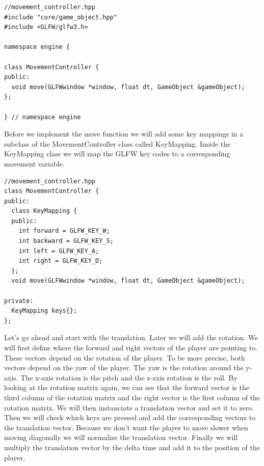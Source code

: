 \documentclass[12pt]{report} \usepackage{preamble}
\begin{document}
\begin{lstlisting}[Language=C++]
//movement_controller.hpp
#include "core/game_object.hpp"
#include <GLFW/glfw3.h>

namespace engine {

class MovementController {
public:
  void move(GLFWwindow *window, float dt, GameObject &gameObject);
};

} // namespace engine
\end{lstlisting}

Before we implement the move function we will add some key mappings in a subclass of the MovementController class called KeyMapping.
Inside the KeyMapping class we will map the GLFW key codes to a corresponding movement variable.

\begin{lstlisting}[Language=C++]
//movement_controller.hpp
class MovementController {
public:
  class KeyMapping {
  public:
    int forward = GLFW_KEY_W;
    int backward = GLFW_KEY_S;
    int left = GLFW_KEY_A;
    int right = GLFW_KEY_D;
  };
  void move(GLFWwindow *window, float dt, GameObject &gameObject);

private:
  KeyMapping keys{};
};
\end{lstlisting}

Let's go ahead and start with the translation. Later we will add the rotation.
We will first define where the forward and right vectors of the player are pointing to.
These vectors depend on the rotation of the player. To be more precise, both vectors depend on the
yaw of the player. The yaw is the rotation around the y-axis. The x-axis rotation is the pitch and the z-axis rotation is the roll.
By looking at the rotation matrix again, we can see that the forward vector is the third column of the rotation matrix
and the right vector is the first column of the rotation matrix.  We will then instanciate a translation vector and set it to zero.
Then we will check which keys are pressed and add the corresponding vectors to the translation vector.
Because we don't want the player to move slower when moving diagonally we will normalize the translation vector.
Finally we will multiply the translation vector by the delta time and add it to the position of the player.
\end{document}
